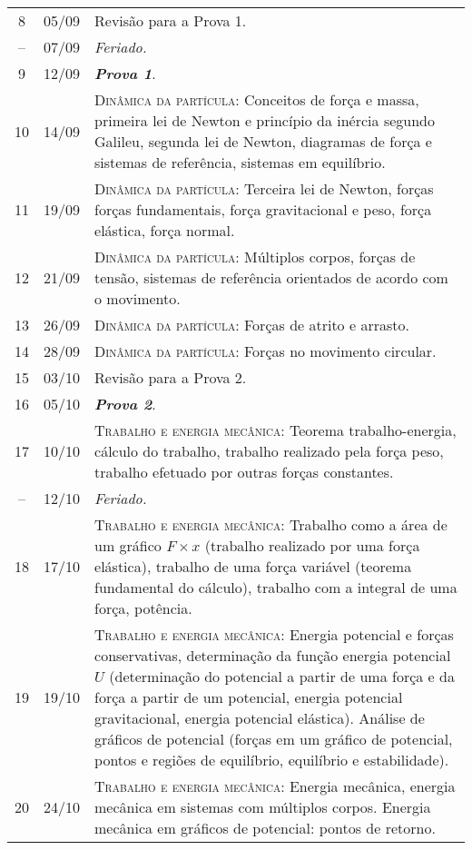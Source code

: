 \begin{center}
\begin{longtable}{ccp{70mm}}
8	 & 	05/09	 & 	Revisão para a Prova 1. \\
--   &  07/09    &  \emph{Feriado.} \\
9	 & 	12/09	 & 	\textbf{\textit{Prova 1}}. \\
10	 & 	14/09	 & 	\textsc{Dinâmica da partícula:} Conceitos de força e massa, primeira lei de Newton e princípio da inércia segundo Galileu, segunda lei de Newton, diagramas de força e sistemas de referência, sistemas em equilíbrio. \\
11	 & 	19/09	 & 	\textsc{Dinâmica da partícula:} Terceira lei de Newton, forças forças fundamentais, força gravitacional e peso, força elástica, força normal. \\
12	 & 	21/09	 & 	\textsc{Dinâmica da partícula:} Múltiplos corpos, forças de tensão, sistemas de referência orientados de acordo com o movimento. \\
13	 & 	26/09	 & 	\textsc{Dinâmica da partícula:} Forças de atrito e arrasto. \\
14	 & 	28/09	 & 	\textsc{Dinâmica da partícula:} Forças no movimento circular. \\
15	 & 	03/10	 & 	Revisão para a Prova 2. \\
16	 & 	05/10	 & 	\textbf{\textit{Prova 2}}. \\
17	 & 	10/10	 & 	\textsc{Trabalho e energia mecânica:} Teorema trabalho-energia, cálculo do trabalho, trabalho realizado pela força peso, trabalho efetuado por outras forças constantes. \\
--   &  12/10    &  \emph{Feriado.} \\
18	 & 	17/10	 & 	\textsc{Trabalho e energia mecânica:} Trabalho como a área de um gráfico $F \times x$ (trabalho realizado por uma força elástica), trabalho de uma força variável (teorema fundamental do cálculo), trabalho com a integral de uma força, potência. \\
19	 & 	19/10	 & 	\textsc{Trabalho e energia mecânica:} Energia potencial e forças conservativas, determinação da função energia potencial $U$ (determinação do potencial a partir de uma força e da força a partir de um potencial, energia potencial gravitacional, energia potencial elástica). Análise de gráficos de potencial (forças em um gráfico de potencial, pontos e regiões de equilíbrio, equilíbrio e estabilidade). \\
20	 & 	24/10	 & 	\textsc{Trabalho e energia mecânica:} Energia mecânica, energia mecânica em sistemas com múltiplos corpos. Energia mecânica em gráficos de potencial: pontos de retorno. \\

\end{longtable}
\end{center}
